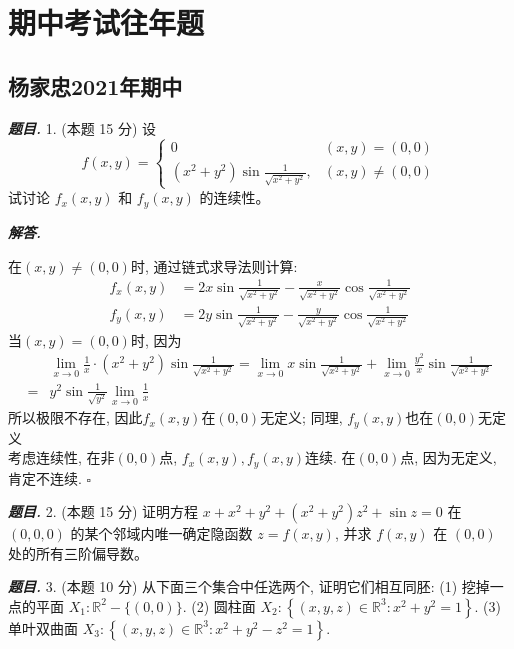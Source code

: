 \documentclass[10pt, a4paper, oneside]{ctexart}
\newenvironment{problem}{\begin{framed}\par\noindent\textbf{\textit{题目. }}}{\end{framed}\par}
\newenvironment{solution}{%
  \par\noindent\textbf{\textit{解答. }}\ignorespaces
}{%
  \hfill\ensuremath{\square}\par %
}
\begin{document}
\section{期中考试往年题}

\subsection{杨家忠2021年期中}

\begin{problem}
1. (本题 15 分) 设
$$
f(x, y)= \begin{cases}0 & (x, y)=(0,0) \\ \left(x^2+y^2\right) \sin \frac{1}{\sqrt{x^2+y^2}}, & (x, y) \neq(0,0)\end{cases}
$$
试讨论 $f_x(x, y)$ 和 $f_y(x, y)$ 的连续性。
\end{problem}

\begin{solution}
在$(x,y)\neq (0,0)$时, 通过链式求导法则计算:
\begin{align*}
    f_{x}(x,y)&=2x\sin \frac{1}{\sqrt{x^2+y^2}} - \frac{x}{\sqrt{x^2+y^2}}\cos \frac{1}{\sqrt{x^2+y^2}}\\
    f_{y}(x,y)&=2y\sin \frac{1}{\sqrt{x^2+y^2}} - \frac{y}{\sqrt{x^2+y^2}}\cos \frac{1}{\sqrt{x^2+y^2}}
\end{align*}
当$(x,y)=(0,0)$时, 因为
\begin{align*}
    &\lim_{x\to 0} \frac{1}{x}\cdot \left(x^2+y^2\right) \sin \frac{1}{\sqrt{x^2+y^2}}=\lim_{x\to 0} x\sin \frac{1}{\sqrt{x^2+y^2}} + \lim_{x\to 0} \frac{y^2}{x}\sin \frac{1}{\sqrt{x^2+y^2}} \\
    =&y^2\sin \frac{1}{\sqrt{y^2}}\lim_{x\to 0} \frac{1}{x}
\end{align*}
所以极限不存在, 因此$f_x(x,y)$在$(0,0)$无定义; 同理, $f_y(x,y)$也在$(0,0)$无定义\\
考虑连续性, 在非$(0,0)$点,  $f_x(x,y), f_y(x,y)$连续. 在$(0,0)$点, 因为无定义, 肯定不连续.
\end{solution}

\begin{problem}
2. (本题 15 分) 证明方程 $x+x^2+y^2+\left(x^2+y^2\right) z^2+\sin z=0$ 在 $(0,0,0)$ 的某个邻域内唯一确定隐函数 $z=f(x, y)$, 并求 $f(x, y)$ 在 $(0,0)$ 处的所有三阶偏导数。
\end{problem}

\begin{problem}
3. (本题 10 分) 从下面三个集合中任选两个, 证明它们相互同胚:
(1) 挖掉一点的平面 $X_1: \mathbb{R}^2-\{(0,0)\}$.
(2) 圆柱面 $X_2:\left\{(x, y, z) \in \mathbb{R}^3: x^2+y^2=1\right\}$.
(3) 单叶双曲面 $X_3:\left\{(x, y, z) \in \mathbb{R}^3: x^2+y^2-z^2=1\right\}$.

\end{problem}
\end{document}
